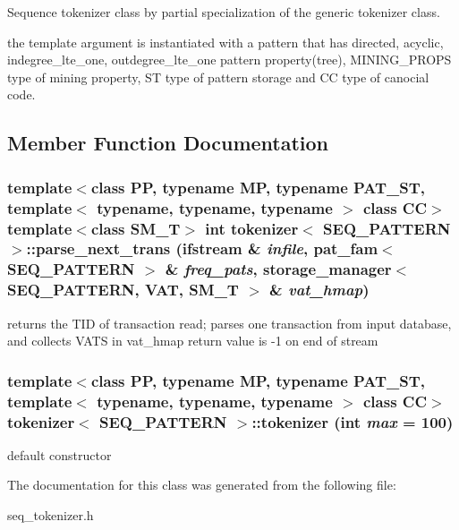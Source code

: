 Sequence tokenizer class by partial specialization of the generic tokenizer class. 

the template argument is instantiated with a pattern that has directed, acyclic, indegree\_\-lte\_\-one, outdegree\_\-lte\_\-one pattern property(tree), MINING\_\-PROPS type of mining property, ST type of pattern storage and CC type of canocial code. 



\subsection{Member Function Documentation}
\subsubsection{\setlength{\rightskip}{0pt plus 5cm}template$<$class PP, typename MP, typename PAT\_\-ST, template$<$ typename, typename, typename $>$ class CC$>$ template$<$class SM\_\-T$>$ int {\bf tokenizer}$<$ SEQ\_\-PATTERN $>$::parse\_\-next\_\-trans (ifstream \& {\em infile}, {\bf pat\_\-fam}$<$ SEQ\_\-PATTERN $>$ \& {\em freq\_\-pats}, {\bf storage\_\-manager}$<$ SEQ\_\-PATTERN, {\bf VAT}, SM\_\-T $>$ \& {\em vat\_\-hmap})\hspace{0.3cm}{\tt  [inline]}}\label{classtokenizer_3_01SEQ__PATTERN_01_4_a1}


returns the TID of transaction read; parses one transaction from input database, and collects VATS in vat\_\-hmap return value is -1 on end of stream 
\subsubsection{\setlength{\rightskip}{0pt plus 5cm}template$<$class PP, typename MP, typename PAT\_\-ST, template$<$ typename, typename, typename $>$ class CC$>$ {\bf tokenizer}$<$ SEQ\_\-PATTERN $>$::{\bf tokenizer} (int {\em max} = 100)\hspace{0.3cm}{\tt  [inline]}}\label{classtokenizer_3_01SEQ__PATTERN_01_4_a0}


default constructor 

The documentation for this class was generated from the following file:\begin{CompactItemize}
\item 
seq\_\-tokenizer.h\end{CompactItemize}
